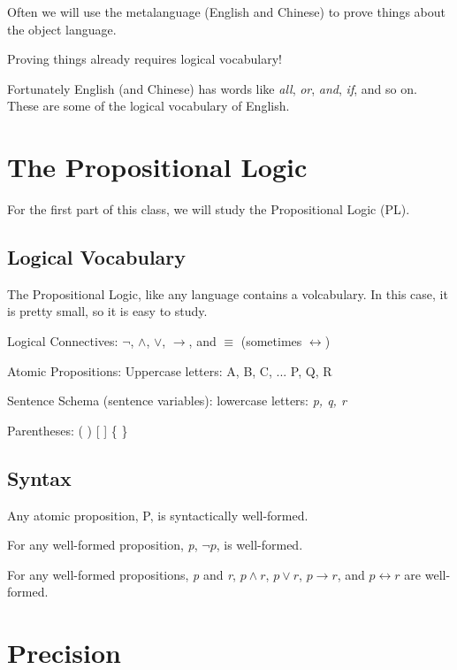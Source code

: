 \documentclass[
paper=128mm:96mm, %
fontsize=11pt, %
pagesize, %
parskip=half-, %
]{scrartcl} %
\theoremstyle{mythmstyle} %
\begin{document}
Often we will use the metalanguage (English and Chinese) to prove things about the object language.

Proving things already requires logical vocabulary!

Fortunately English (and Chinese) has words like \textit{all}, \textit{or}, \textit{and}, \textit{if}, and so on. These are some of the logical vocabulary of English.

\clearpage


\section{The Propositional Logic}

For the first part of this class, we will study the Propositional Logic (PL).

\clearpage

\subsection{Logical Vocabulary}

The Propositional Logic, like any  language contains a volcabulary. In this case, it is pretty small, so it is easy to study.

Logical Connectives: $\neg$, $\land$, $\lor$, $\rightarrow$, and $\equiv$ (sometimes $\leftrightarrow$)

Atomic Propositions: Uppercase letters: A, B, C, ... P, Q, R

Sentence Schema (sentence variables): lowercase letters: \textit{p, q, r}

Parentheses: ( ) [ ] \{ \}
\clearpage

\subsection{Syntax}

Any atomic proposition, P, is syntactically well-formed.

For any well-formed proposition, \textit{p}, $\neg p$, is well-formed.

For any well-formed propositions, \textit{p} and \textit{r}, $p \land r$, $p \lor r$, $p \rightarrow r$, and $p \leftrightarrow r$ are well-formed.

\clearpage

\section{Precision}
\end{document}
